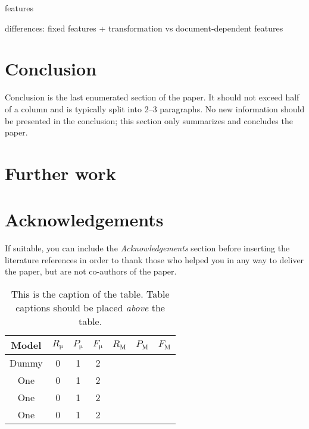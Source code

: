 \documentclass[10pt, a4paper]{article}
\begin{document}
features

differences: fixed features + transformation vs document-dependent features

\section{Conclusion}

Conclusion is the last enumerated section of the paper. It should not exceed half of a column and is typically split into 2--3 paragraphs. No new information should be presented in the conclusion; this section only summarizes and concludes the paper.

\section{Further work}

\section*{Acknowledgements}



If suitable, you can include the \textit{Acknowledgements} section before inserting the literature references  in order to thank those who helped you in any way to deliver the paper, but are not co-authors of the paper.

\begin{table}
	\caption{This is the caption of the table. Table captions should be placed \textit{above} the table.}
	\label{tab:narrow-table}
	\begin{center}
		\begin{tabular}{c|ccc|ccc}
			\toprule
			Model & $R_\mathrm{\mu}$ & $P_\mathrm{\mu}$ & $F_\mathrm{\mu}$ & $R_\mathrm{M}$ & $P_\mathrm{M}$ & $F_\mathrm{M}$\\
			\midrule
			Dummy & 0 & 1 & 2 \\
			One & 0 & 1 & 2 \\
			One & 0 & 1 & 2 \\
			\midrule
			One & 0 & 1 & 2 \\
			\bottomrule
		\end{tabular}
	\end{center}
\end{table}



\end{document}
